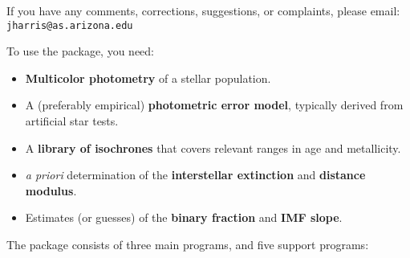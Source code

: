 \documentclass[12pt]{book}
\def\ttb{\tt\color{myBlue}}
\begin{document}
\medskip
\noindent
If you have any comments, corrections, suggestions, or complaints,
please email: \\
{\ttb jharris@as.arizona.edu}

\bigskip
\noindent
To use the package, you need:

\begin{itemize}
\item {\bf Multicolor photometry} of a stellar population. \\

\item A (preferably empirical) {\bf photometric error model}, 
typically derived from artificial star tests. \\

\item A {\bf library of isochrones} that covers relevant ranges in age 
and metallicity. \\

\item {\it a priori} determination of the {\bf interstellar 
extinction} and {\bf distance modulus}. \\

\item Estimates (or guesses) of the {\bf binary fraction} and {\bf IMF 
slope}. \\
\end{itemize}

\clearpage

The package consists of three main programs, and five support
programs: 
\end{document}
